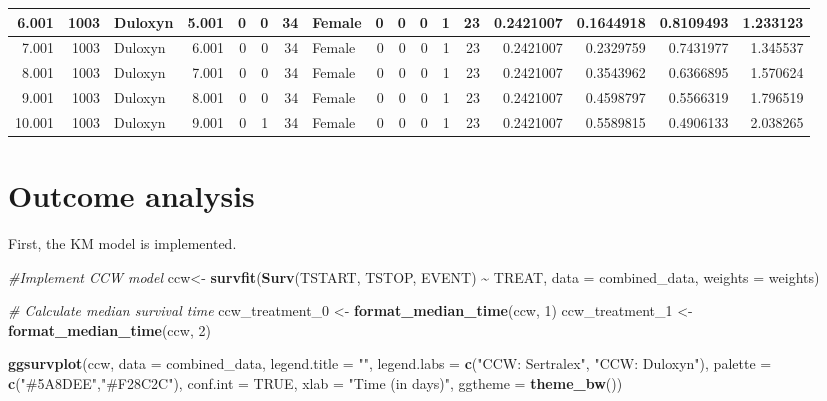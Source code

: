 \documentclass[
]{book}
\newenvironment{Shaded}{\begin{snugshade}}{\end{snugshade}}
\newcommand{\AttributeTok}[1]{\textcolor[rgb]{0.13,0.29,0.53}{#1}}
\newcommand{\CommentTok}[1]{\textcolor[rgb]{0.56,0.35,0.01}{\textit{#1}}}
\newcommand{\ConstantTok}[1]{\textcolor[rgb]{0.56,0.35,0.01}{#1}}
\newcommand{\DecValTok}[1]{\textcolor[rgb]{0.00,0.00,0.81}{#1}}
\newcommand{\FunctionTok}[1]{\textcolor[rgb]{0.13,0.29,0.53}{\textbf{#1}}}
\newcommand{\NormalTok}[1]{#1}
\newcommand{\OtherTok}[1]{\textcolor[rgb]{0.56,0.35,0.01}{#1}}
\newcommand{\SpecialCharTok}[1]{\textcolor[rgb]{0.81,0.36,0.00}{\textbf{#1}}}
\newcommand{\StringTok}[1]{\textcolor[rgb]{0.31,0.60,0.02}{#1}}
\begin{document}
\begin{table}
\begin{tabular}[t]{r|r|l|r|r|r|r|l|r|r|r|r|r|r|r|r|r}
\hline
6.001 & 1003 & Duloxyn & 5.001 & 0 & 0 & 34 & Female & 0 & 0 & 0 & 1 & 23 & 0.2421007 & 0.1644918 & 0.8109493 & 1.233123\\
\hline
7.001 & 1003 & Duloxyn & 6.001 & 0 & 0 & 34 & Female & 0 & 0 & 0 & 1 & 23 & 0.2421007 & 0.2329759 & 0.7431977 & 1.345537\\
\hline
8.001 & 1003 & Duloxyn & 7.001 & 0 & 0 & 34 & Female & 0 & 0 & 0 & 1 & 23 & 0.2421007 & 0.3543962 & 0.6366895 & 1.570624\\
\hline
9.001 & 1003 & Duloxyn & 8.001 & 0 & 0 & 34 & Female & 0 & 0 & 0 & 1 & 23 & 0.2421007 & 0.4598797 & 0.5566319 & 1.796519\\
\hline
10.001 & 1003 & Duloxyn & 9.001 & 0 & 1 & 34 & Female & 0 & 0 & 0 & 1 & 23 & 0.2421007 & 0.5589815 & 0.4906133 & 2.038265\\
\hline
\end{tabular}
\endgroup{}
\end{table}

\section{Outcome analysis}\label{outcome-analysis-1}

First, the KM model is implemented.

\begin{Shaded}
\begin{Highlighting}[]
\CommentTok{\#Implement CCW  model}
\NormalTok{ccw}\OtherTok{\textless{}{-}} \FunctionTok{survfit}\NormalTok{(}\FunctionTok{Surv}\NormalTok{(TSTART, TSTOP, EVENT) }\SpecialCharTok{\textasciitilde{}}\NormalTok{ TREAT, }\AttributeTok{data =}\NormalTok{ combined\_data, }\AttributeTok{weights =}\NormalTok{ weights)}

\CommentTok{\# Calculate median survival time}
\NormalTok{ccw\_treatment\_0 }\OtherTok{\textless{}{-}} \FunctionTok{format\_median\_time}\NormalTok{(ccw, }\DecValTok{1}\NormalTok{)}
\NormalTok{ccw\_treatment\_1 }\OtherTok{\textless{}{-}} \FunctionTok{format\_median\_time}\NormalTok{(ccw, }\DecValTok{2}\NormalTok{)}

\FunctionTok{ggsurvplot}\NormalTok{(ccw, }
           \AttributeTok{data =}\NormalTok{ combined\_data,}
           \AttributeTok{legend.title =} \StringTok{""}\NormalTok{,}
           \AttributeTok{legend.labs =} \FunctionTok{c}\NormalTok{(}\StringTok{"CCW: Sertralex"}\NormalTok{,}
                           \StringTok{"CCW: Duloxyn"}\NormalTok{),}
           \AttributeTok{palette =} \FunctionTok{c}\NormalTok{(}\StringTok{"\#5A8DEE"}\NormalTok{,}\StringTok{"\#F28C2C"}\NormalTok{),}
           \AttributeTok{conf.int =} \ConstantTok{TRUE}\NormalTok{,}
           \AttributeTok{xlab =} \StringTok{"Time (in days)"}\NormalTok{,}
           \AttributeTok{ggtheme =} \FunctionTok{theme\_bw}\NormalTok{())}
\end{Highlighting}
\end{Shaded}
\end{document}
